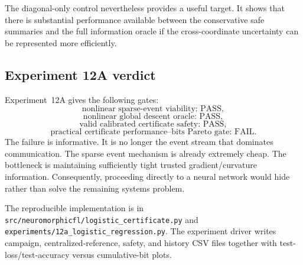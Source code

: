 The diagonal-only control nevertheless provides a useful target. It shows that there is substantial performance available between the conservative safe summaries and the full information oracle if the cross-coordinate uncertainty can be represented more efficiently.

\subsection{Experiment 12A verdict}

Experiment~12A gives the following gates:
\begin{equation}
  \boxed{\text{nonlinear sparse-event viability: PASS}},
\end{equation}
\begin{equation}
  \boxed{\text{nonlinear global descent oracle: PASS}},
\end{equation}
\begin{equation}
  \boxed{\text{valid calibrated certificate safety: PASS}},
\end{equation}
\begin{equation}
  \boxed{\text{practical certificate performance--bits Pareto gate: FAIL}}.
\end{equation}
The failure is informative. It is no longer the event stream that dominates communication. The sparse event mechanism is already extremely cheap. The bottleneck is maintaining sufficiently tight trusted gradient/curvature information. Consequently, proceeding directly to a neural network would hide rather than solve the remaining systems problem.

The reproducible implementation is in \texttt{src/neuromorphicfl/logistic\_certificate.py} and \texttt{experiments/12a\_logistic\_regression.py}. The experiment driver writes campaign, centralized-reference, safety, and history CSV files together with test-loss/test-accuracy versus cumulative-bit plots.
